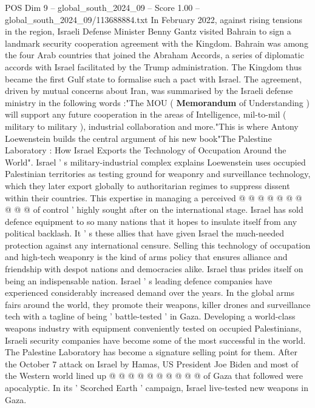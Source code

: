 \begin{textsample}{POS Dim 9 – global\_south\_2024\_09 – Score 1.00 – global\_south\_2024\_09/113688884.txt}  \label{ex:f9_pos_338}
In February 2022, against rising tensions in the region, Israeli Defense Minister Benny Gantz visited Bahrain to sign a landmark security cooperation agreement with the Kingdom.
Bahrain was among the four Arab countries that joined the Abraham Accords, a series of diplomatic accords with Israel facilitated by the Trump administration.
The Kingdom thus became the first Gulf state to formalise such a pact with Israel.
The agreement, driven by mutual concerns about Iran, was summarised by the Israeli defense ministry in the following words :"The MOU ( \textbf{Memorandum} of Understanding ) will support any future cooperation in the areas of Intelligence, mil-to-mil ( military to military ), industrial collaboration and more."This is where Antony Loewenstein builds the central argument of his new book"The Palestine Laboratory : How Israel Exports the Technology of Occupation Around the World".
Israel ' s military-industrial complex explains Loewenstein uses occupied Palestinian territories as testing ground for weaponry and surveillance technology, which they later export globally to authoritarian regimes to suppress dissent within their countries.
This expertise in managing a perceived @ @ @ @ @ @ @ @ @ @ of control ' highly sought after on the international stage.
Israel has sold defence equipment to so many nations that it hopes to insulate itself from any political backlash.
It ' s these allies that have given Israel the much-needed protection against any international censure.
Selling this technology of occupation and high-tech weaponry is the kind of arms policy that ensures alliance and friendship with despot nations and democracies alike.
Israel thus prides itself on being an indispensable nation.
Israel ' s leading defence companies have experienced considerably increased demand over the years.
In the global arms fairs around the world, they promote their weapons, killer drones and surveillance tech with a tagline of being ' battle-tested ' in Gaza.
Developing a world-class weapons industry with equipment conveniently tested on occupied Palestinians, Israeli security companies have become some of the most successful in the world.
The Palestine Laboratory has become a signature selling point for them.
After the October 7 attack on Israel by Hamas, US President Joe Biden and most of the Western world lined up @ @ @ @ @ @ @ @ @ @ of Gaza that followed were apocalyptic.
In its ' Scorched Earth ' campaign, Israel live-tested new weapons in Gaza.

\end{textsample}
